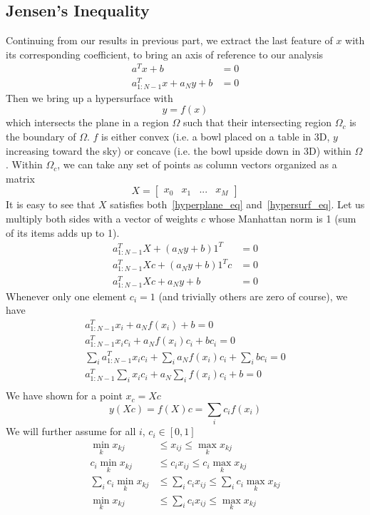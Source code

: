 \documentclass{article}
\numberwithin{equation}{subsection}
\begin{document}
\subsection{Jensen's Inequality}
Continuing from our results in previous part, we extract the last feature of $x$ with its corresponding coefficient, to bring an axis of reference to our analysis
\begin{align}
    a^Tx+b &= 0\\
    a_{1:N-1}^Tx+a_Ny+b &= 0 \label{hyperplane_eq}
\end{align}
Then we bring up a hypersurface with 
\begin{equation}
    y=f(x) \label{hypersurf_eq}
\end{equation}
which intersects the plane in a region $\Omega$ such that their intersecting region $\Omega_c$ is the boundary of $\Omega$. $f$ is either convex (i.e. a bowl placed on a table in 3D, $y$ increasing toward the sky) or concave (i.e. the bowl upside down in 3D) within $\Omega$. Within $\Omega_c$, we can take any set of points as column vectors organized as a matrix
$$
X = \begin{bmatrix}
    x_0 & x_1 & ... & x_M
\end{bmatrix}
$$
It is easy to see that $X$ satisfies both~\ref{hyperplane_eq} and~\ref{hypersurf_eq}. Let us multiply both sides with a vector of weights $c$ whose Manhattan norm is 1 (sum of its items adds up to 1). 
\begin{align}
    a_{1:N-1}^TX+(a_Ny+b)1^T &= 0\\
    a_{1:N-1}^TXc+(a_Ny+b)1^Tc &= 0\\
    a_{1:N-1}^TXc+a_Ny+b &= 0
\end{align}
Whenever only one element $c_i=1$ (and trivially others are zero of course), we have
\begin{align}
    a_{1:N-1}^Tx_i+a_Nf(x_i)+b = 0\\
    a_{1:N-1}^Tx_ic_i+a_Nf(x_i)c_i+bc_i = 0\\
    \sum_i a_{1:N-1}^Tx_ic_i+\sum_i a_Nf(x_i)c_i+\sum_i bc_i = 0\\
    a_{1:N-1}^T\sum_i x_ic_i+a_N\sum_i f(x_i)c_i+b = 0\\
\end{align}
We have shown for a point $x_c=Xc$ 
\begin{equation}
    y(Xc)=f(X)c=\sum_i c_if(x_i)
\end{equation}
We will further assume for all $i$, $c_i \in [0,1]$
\begin{align}
    \min_kx_{kj} &\leq x_{ij} \leq \max_kx_{kj}\\
    c_i\min_kx_{kj} &\leq c_ix_{ij} \leq c_i\max_kx_{kj}\\
    \sum_i c_i\min_kx_{kj} &\leq \sum_i c_ix_{ij} \leq \sum_i c_i\max_kx_{kj}\\
    \min_kx_{kj} &\leq \sum_i c_ix_{ij} \leq \max_kx_{kj}\\
\end{align}
\end{document}
